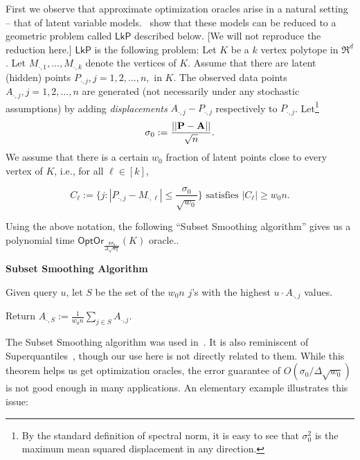 \documentclass[11pt,letterpaper]{article}
\newcommand{\bP}{{\bf P}}
\newcommand{\bA}{{\bf A}}
\newcommand{\lkp}{{\mathsf {LkP}}\xspace}
\newcommand{\olp}{{\mathsf {OLP}}\xspace}
\newcommand{\kolp}{k\mbox{-}\olp}
\newcommand{\Mdot}[1]{{M_{\cdot, #1}}}
\newcommand{\opto}{{\mathsf{OptOr}}}
\begin{document}
First we observe that approximate optimization oracles arise in a 
natural setting -- that of latent variable models.~\cite{BhattacharyyaK20} show that these models can be reduced to a geometric problem called $\lkp$ described below. [We will not reproduce the reduction here.] 
%   
$\lkp$ is the following problem: Let $K$ be a $k$ vertex polytope in $\Re^d$. 
Let $\Mdot{1}, \ldots, \Mdot{k}$ denote the vertices of $K$.  
Assume that there are latent (hidden) points $P_{\cdot ,j}, j=1,2,\ldots ,n,$ in $K$. The observed data points $A_{\cdot,j}, j=1,2,\ldots ,n$ are generated (not necessarily under any stochastic assumptions) by adding {\it displacements} $A_{\cdot,j}-P_{\cdot,j}$ respectively to $P_{\cdot,j}$. Let\footnote{By the standard definition of spectral norm, it is easy to see that $\sigma_0^2$ is the maximum mean squared displacement in any direction.}
$$\sigma_0 :=\frac{||\bP-\bA||}{\sqrt n}.$$
%
We assume that there is a certain $w_0$ fraction of latent points close to every vertex of $K$, i.e., for all $\ell \in [k]$, 

$$  C_\ell :=\{j:|P_{\cdot,j}-M_{\cdot,\ell}|\leq\frac{\sigma_0}{\sqrt{w_0}}\} \mbox{ satisfies    }
|C_\ell|\geq w_0n.$$

\begin{theorem} \label{subset-smoothing-0}
Using the above notation, the following ``Subset Smoothing  algorithm'' gives us a polynomial time  $\opto_{\frac{4\sigma_0}{\Delta \sqrt{w_0}}}(K)$ oracle..
\end{theorem}

\begin{framed}

{\bf Subset Smoothing Algorithm}

Given query $u$, let $S$ be the set  of the $w_0 n$ $j$'s with the highest $u\cdot A_{\cdot,j}$ values. 

Return 
$A_{\cdot , S}:=\frac{1}{w_0n}\sum_{j\in S} A_{\cdot,j}.$

\end{framed}

The Subset Smoothing algorithm was used in~\cite{BhattacharyyaK20}. It is also reminiscent of Superquantiles~\cite{rockafellar2014random}, though our use here is not directly related to them.
While this theorem helps us get optimization oracles, the error guarantee of $O(\sigma_0/\Delta \sqrt{w_0})$ is not good enough in many applications. An elementary example illustrates this issue:
\end{document}
